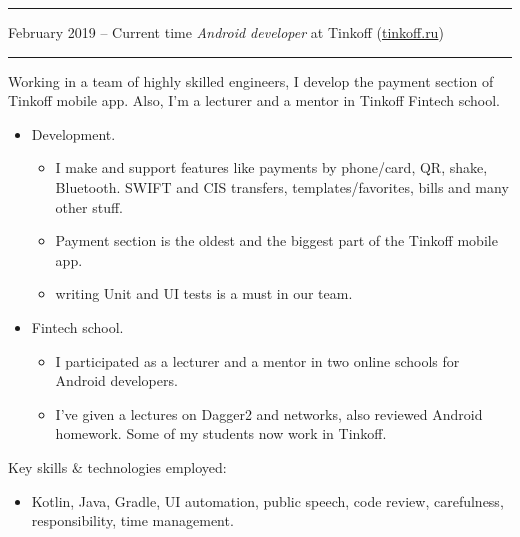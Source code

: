 \documentclass[11pt]{article}
\newcommand\CvSmallSkipLength{0.5em}
\newcommand\CvSkip[1]{\vspace{#1}}
\newcommand\CvSmallSkip{\CvSkip{\CvSmallSkipLength}}
\newcommand\CvRule{\begingroup\color{CvRuleColor}\hrule\endgroup}
\newcommand\CvWorkplaceHeader[5]{\begingroup%
	\CvRule%
	\fboxsep0pt%
	\colorbox{CvWorkplaceHeaderColor}{%
		\begin{minipage}{\linewidth-2\fboxsep}%
			\CvSmallSkip%
			#1 -- #2 \hfill \textit{#3} at #4 (\href{http://#5/}{#5})%
			\CvSmallSkip%
		\end{minipage}%
	}%
	\CvRule%
	\endgroup%
}
\newenvironment{CvWorkplaceDescription}{%
	\begingroup\setlength\parskip{\CvSmallSkipLength}%
}{%
	\CvSmallSkip\endgroup%
}
\begin{document}
	\CvWorkplaceHeader{February 2019}{Current time}{Android developer}{Tinkoff}{tinkoff.ru}
	\begin{CvWorkplaceDescription}
		Working in a team of highly skilled engineers, I develop the payment section of Tinkoff mobile app. Also, I'm a lecturer and a mentor in Tinkoff Fintech school.
		\begin{itemize}[noitemsep]
			\item Development.
			\begin{itemize}
				\item I make and support features like payments by phone/card, QR, shake, Bluetooth. SWIFT and CIS transfers, templates/favorites, bills and many other stuff.
				\item Payment section is the oldest and the biggest part of the Tinkoff mobile app.
				\item writing Unit and UI tests is a must in our team.
			\end{itemize}
			
			\item Fintech school.
			\begin{itemize}
				\item I participated as a lecturer and a mentor in two online schools for Android developers. 
				\item I've given a lectures on Dagger2 and networks, also reviewed Android homework. Some of my students now work in Tinkoff. 
			\end{itemize}
		\end{itemize}
		
		Key skills \& technologies employed:
		\begin{itemize}[noitemsep]
			\item Kotlin, Java, Gradle, UI automation, public speech, code review, carefulness, responsibility, time management. 
		\end{itemize}
		
		
	\end{CvWorkplaceDescription}
	
\end{document}
